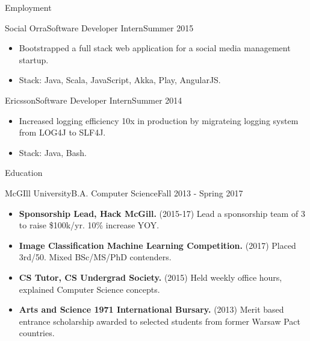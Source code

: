 \documentclass[]{muchicv}
\begin{document}
\begin{cvsection}{Employment}
		\begin{cvsubsection}{Social Orra}{Software Developer Intern}{Summer 2015}
			\begin{itemize}
				\item Bootstrapped a full stack web application for a social media management startup.
				\item Stack: Java, Scala, JavaScript, Akka, Play, AngularJS.
			\end{itemize}
		\end{cvsubsection}
		
		\begin{cvsubsection}{Ericsson}{Software Developer Intern}{Summer 2014}
			\begin{itemize}
				\item Increased logging efficiency 10x in production by migrateing logging system from LOG4J to SLF4J.
				\item Stack: Java, Bash.
			\end{itemize}
		\end{cvsubsection}
	\end{cvsection}
	
	\begin{cvsection}{Education}
		\begin{cvsubsection}{McGIll University}{B.A. Computer Science}{Fall 2013 - Spring 2017}
			\begin{itemize}
				\item \textbf{Sponsorship Lead, Hack McGill.} (2015-17) Lead a sponsorship team of 3 to raise \$100k/yr. 10\% increase YOY.
				\item \textbf{Image Classification Machine Learning Competition.} (2017) Placed 3rd/50. Mixed BSc/MS/PhD contenders.
				\item \textbf{CS Tutor, CS Undergrad Society.} (2015) Held weekly office hours, explained Computer Science concepts.
				\item \textbf{Arts and Science 1971 International Bursary.} (2013) Merit based entrance scholarship awarded to selected students from former Warsaw Pact countries.
			\end{itemize}
		\end{cvsubsection}
	\end{cvsection}
	
\end{document}
